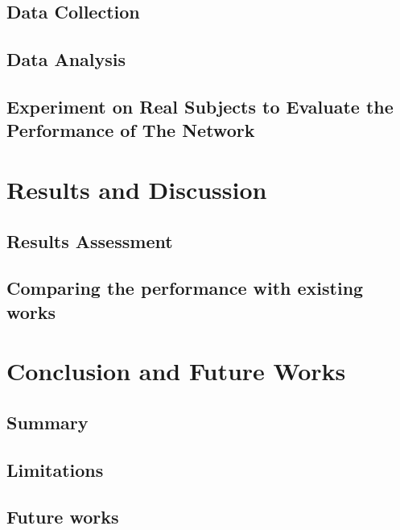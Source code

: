 \documentclass[letterpaper,12pt,titlepage,oneside,final]{book}
\begin{document}
\section{Data Collection}

\section{Data Analysis}

\section{Experiment on Real Subjects to Evaluate the Performance of The Network}

\chapter{Results and Discussion}

\section{Results Assessment}

\section{Comparing the performance with existing works}

\chapter{Conclusion and Future Works}

\section{Summary}

\section{Limitations}

\section{Future works}


\appendix
\end{document}
